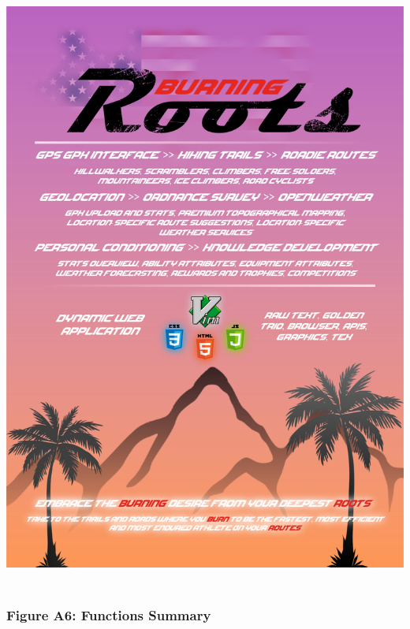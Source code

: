 \documentclass[11pt, english]{article}
\begin{document}
	\begin{center}	
		\includegraphics[width=14cm,height=20cm]{../System/Photos/poster.jpg}
	\end{center}

\newpage

		\subsubsection*{Figure A6: Functions Summary}
\end{document}
